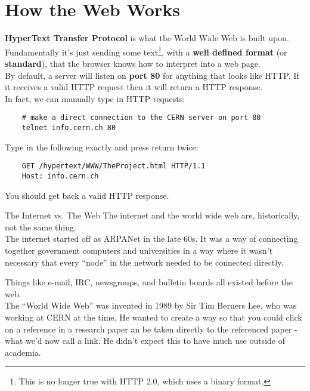 \section{How the Web Works}

\textbf{HyperText Transfer Protocol} is what the World Wide Web is built upon.
\\

Fundamentally it's just sending some text\footnote{This is no longer true with HTTP 2.0, which uses a binary format.}, with a \textbf{well defined format} (or \textbf{standard}), that the browser knows how to interpret into a web page.
\\

By default, a server will listen on \textbf{port 80} for anything that looks like HTTP. If it receives a valid HTTP request then it will return a HTTP response.
\\

In fact, we can manually type in HTTP requests:

\begin{verbatim}
    # make a direct connection to the CERN server on port 80
    telnet info.cern.ch 80
\end{verbatim}

Type in the following exactly and press return twice:

\begin{verbatim}
    GET /hypertext/WWW/TheProject.html HTTP/1.1
    Host: info.cern.ch
\end{verbatim}

You should get back a valid HTTP response.

\begin{infobox}{The Internet vs. The Web}
    The internet and the world wide web are, historically, not the same thing.
    \\

    The internet started off as ARPANet in the late 60s. It was a way of connecting together government computers and universities in a way where it wasn't necessary that every ``node'' in the network needed to be connected directly.
    \\


    Things like e-mail, IRC, newsgroups, and bulletin boards all existed before the web.
    \\

    The ``World Wide Web'' was invented in 1989 by Sir Tim Berners Lee, who was working at CERN at the time. He wanted to create a way so that you could click on a reference in a research paper an be taken directly to the referenced paper - what we'd now call a link. He didn't expect this to have much use outside of academia.
\end{infobox}


